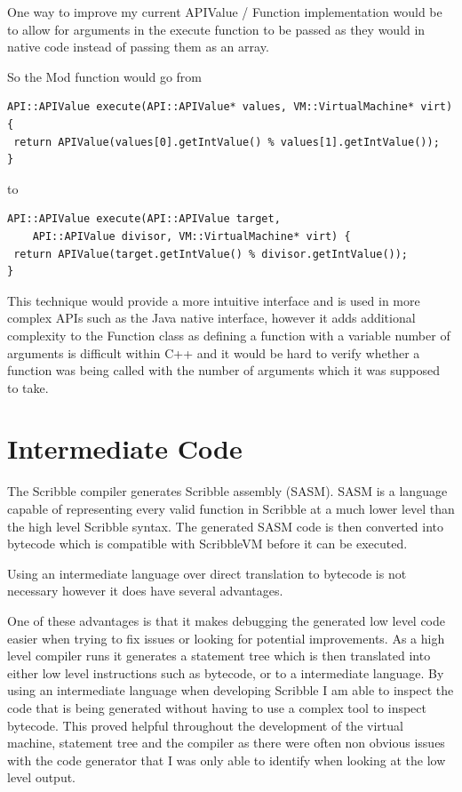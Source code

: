 \documentclass[]{final_report}
\begin{document}
One way to improve my current APIValue / Function implementation would be to allow for arguments in the execute function to be passed as they would in native code instead of passing them as an array.

So the Mod function would go from
\begin{verbatim}
API::APIValue execute(API::APIValue* values, VM::VirtualMachine* virt) {
 return APIValue(values[0].getIntValue() % values[1].getIntValue());
}
\end{verbatim}
to
\begin{verbatim}
API::APIValue execute(API::APIValue target, 
    API::APIValue divisor, VM::VirtualMachine* virt) {
 return APIValue(target.getIntValue() % divisor.getIntValue());
}
\end{verbatim}

This technique would provide a more intuitive interface and is used in more complex APIs such as the Java native interface, however it adds additional complexity to the Function class as defining a function with a variable number of arguments is difficult within C++ and it would be hard to verify whether a function was being called with the number of arguments which it was supposed to take.

\chapter{Intermediate Code}

The Scribble compiler generates Scribble assembly (SASM). SASM is a language capable of representing every valid function in Scribble at a much lower level than the high level Scribble syntax. The generated SASM code is then converted into bytecode which is compatible with ScribbleVM before it can be executed.

Using an intermediate language over direct translation to bytecode is not necessary however it does have several advantages.

One of these advantages is that it makes debugging the generated low level code easier when trying to fix issues or looking for potential improvements. As a high level compiler runs it generates a statement tree which is then translated into either low level instructions such as bytecode, or to a intermediate language. By using an intermediate language when developing Scribble I am able to inspect the code that is being generated without having to use a complex tool to inspect bytecode. This proved helpful throughout the development of the virtual machine, statement tree and the compiler as there were often non obvious issues with the code generator that I was only able to identify when looking at the low level output.
\end{document}
